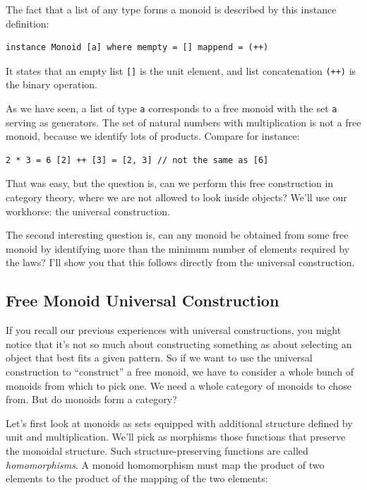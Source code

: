 The fact that a list of any type forms a monoid is described by this
instance definition:

\begin{verbatim}
instance Monoid [a] where mempty = [] mappend = (++)
\end{verbatim}

It states that an empty list \texttt{{[}{]}} is the unit element, and
list concatenation \texttt{(++)} is the binary operation.

As we have seen, a list of type \texttt{a} corresponds to a free monoid
with the set \texttt{a} serving as generators. The set of natural
numbers with multiplication is not a free monoid, because we identify
lots of products. Compare for instance:

\begin{verbatim}
2 * 3 = 6 [2] ++ [3] = [2, 3] // not the same as [6]
\end{verbatim}

That was easy, but the question is, can we perform this free
construction in category theory, where we are not allowed to look inside
objects? We'll use our workhorse: the universal construction.

The second interesting question is, can any monoid be obtained from some
free monoid by identifying more than the minimum number of elements
required by the laws? I'll show you that this follows directly from the
universal construction.

\subsection{Free Monoid Universal
Construction}\label{free-monoid-universal-construction}

If you recall our previous experiences with universal constructions, you
might notice that it's not so much about constructing something as about
selecting an object that best fits a given pattern. So if we want to use
the universal construction to ``construct'' a free monoid, we have to
consider a whole bunch of monoids from which to pick one. We need a
whole category of monoids to chose from. But do monoids form a category?

Let's first look at monoids as sets equipped with additional structure
defined by unit and multiplication. We'll pick as morphisms those
functions that preserve the monoidal structure. Such
structure-preserving functions are called \emph{homomorphisms}. A monoid
homomorphism must map the product of two elements to the product of the
mapping of the two elements:

